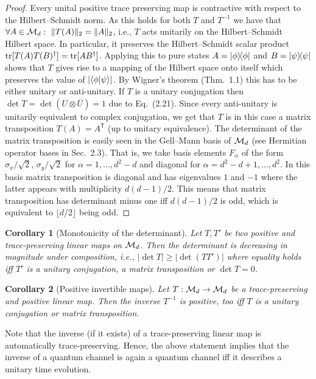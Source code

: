 \documentclass[11pt,a4paper]{article}
\theoremstyle{plain}
\newtheorem{corollary}{Corollary}[section]
\theoremstyle{definition}
\theoremstyle{remark}
\begin{document}
\begin{proof}
    Every unital positive trace preserving map is contractive with respect to the
    Hilbert--Schmidt norm. As this holds for both $T$ and $T^{-1}$ we have that
    $\forall A\in\mcM_d:\ \|T(A)\|_2=\|A\|_2$, i.e., $T$ acts unitarily on the
    Hilbert--Schmidt Hilbert space. In particular, it preserves the Hilbert--Schmidt
    scalar product $\operatorname{tr}[T(A)T(B)^\dagger]=\operatorname{tr}[AB^\dagger]$. Applying this to pure states
    $A=|\phi\rangle\!\langle\phi|$ and $B=|\psi\rangle\!\langle\psi|$ shows that $T$ gives rise
    to a mapping of the Hilbert space onto itself which preserves the value of
    $|\langle\phi|\psi\rangle|$. By Wigner's theorem (Thm.~1.1) this has to be either
    unitary or anti-unitary. If $T$ is a unitary conjugation then
    $\det T=\det(U\otimes \overline{U})=1$ due to Eq.~(2.21). Since every anti-unitary
    is unitarily equivalent to complex conjugation, we get that $T$ is in this case a
    matrix transposition $T(A)=A^{\mathsf T}$ (up to unitary equivalence). The determinant
    of the matrix transposition is easily seen in the Gell--Mann basis of $\mathcal{M}_d$
    (see Hermitian operator bases in Sec.~2.3). That is, we take basis elements $F_\alpha$
    of the form $\sigma_x/\sqrt{2}$, $\sigma_y/\sqrt{2}$ for $\alpha=1,\dots,d^2-d$ and
    diagonal for $\alpha=d^2-d+1,\dots,d^2$. In this basis matrix transposition is
    diagonal and has eigenvalues $1$ and $-1$ where the latter appears with multiplicity
    $d(d-1)/2$. This means that matrix transposition has determinant minus one iff
    $d(d-1)/2$ is odd, which is equivalent to $\lfloor d/2\rfloor$ being odd.
\end{proof}

\begin{corollary}[Monotonicity of the determinant]
    Let $T,T'$ be two positive and trace-preserving linear maps on $\mathcal{M}_d$. Then the
    determinant is decreasing in magnitude under composition, i.e.,
    $|\det T|\ge |\det(TT')|$ where equality holds iff $T'$ is a unitary conjugation,
    a matrix transposition or $\det T=0$.
\end{corollary}

\begin{corollary}[Positive invertible maps]
    Let $T:\mathcal{M}_d\to\mathcal{M}_d$ be a trace-preserving and positive linear map. Then the
    inverse $T^{-1}$ is positive, too iff $T$ is a unitary conjugation or matrix
    transposition.
\end{corollary}

Note that the inverse (if it exists) of a trace-preserving linear map is
automatically trace-preserving. Hence, the above statement implies that the
inverse of a quantum channel is again a quantum channel iff it describes a
unitary time evolution.
\end{document}
